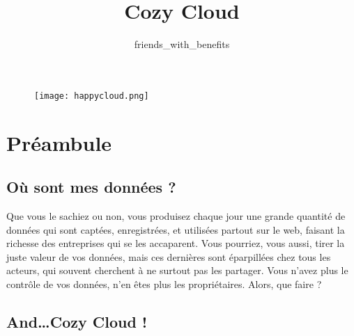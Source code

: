 \documentclass{42-fr}
\begin{document}
                           \title{Cozy Cloud}
\begin{figure}[t]
	\begin{center}
		\texttt{[image: happycloud.png]}
	\end{center}
\end{figure}
                          \subtitle{friends\_with\_benefits}


\maketitle

\tableofcontents



\chapter{Préambule}



	\section{O\`u sont mes donn\'ees ?}

		Que vous le sachiez ou non, vous produisez chaque jour une grande quantit\'e de donn\'ees
		qui sont capt\'ees, enregistr\'ees, et utilis\'ees partout sur le web, faisant
		la richesse des entreprises qui se les accaparent. Vous pourriez, vous aussi,
		tirer la juste valeur de vos donn\'ees, mais ces derni\`eres sont \'eparpill\'ees
		chez tous les acteurs, qui souvent cherchent \`a ne surtout pas les partager.
		Vous n'avez plus le contrôle de vos donn\'ees, n'en \^etes plus les propri\'etaires.
		Alors, que faire ?


	\section{And…Cozy Cloud !}
\end{document}
